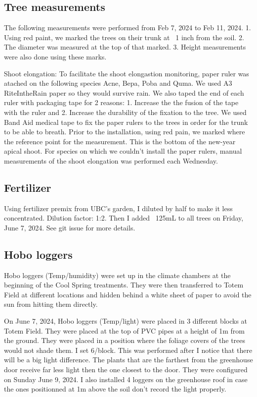 \documentclass{article}
\begin{document}
\subsection{Tree measurements}
The following measurements were performed from Feb 7, 2024 to Feb 11, 2024.
1. Using red paint, we marked the trees on their trunk at ~1 inch from the soil. 2. The diameter was measured at the top of that marked. 3. Height measurements were also done using these marks. 
\par
Shoot elongation: To facilitate the shoot elongastion monitoring,  paper ruler was atached on the following species Acne, Bepa, Poba and Quma. We used A3 RiteIntheRain paper so they would survive rain. We also taped the end of each ruler with packaging tape for 2 reasons: 1. Increase the the fusion of the tape with the ruler and 2. Increase the durability of the fixation to the tree. We used Band Aid medical tape to fix the paper rulers to the trees in order for the trunk to be able to breath. Prior to the installation, using red pain, we marked where the reference point for the measurement. This is the bottom of the new-year apical shoot. For species on which we couldn't install the paper rulers, manual measurements of the shoot elongation was performed each Wednesday. 
\subsection {Fertilizer}
Using fertilizer premix from UBC's garden, I diluted by half to make it less concentrated. Dilution factor: 1:2. Then I added ~125mL to all trees on Friday, June 7, 2024. See git issue for more details. 

\subsection{Hobo loggers}
Hobo loggers (Temp/humidity) were set up in the climate chambers at the beginning of the Cool Spring treatments. They were then transferred to Totem Field at different locations and hidden behind a white sheet of paper to avoid the sun from hitting them directly. 
\par 
On June 7, 2024, Hobo loggers (Temp/light) were placed in 3 different blocks at Totem Field. They were placed at the top of PVC pipes at a height of 1m from the ground. They were placed in a position where the foliage covers of the trees would not shade them. I set 6/block. This was performed after I notice that there will be a big light difference. The plants that are the farthest from the greenhouse door receive far less light then the one closest to the door. They were configured on Sunday June 9, 2024. I also installed 4 loggers on the greenhouse roof in case the ones positionned at 1m above the soil don't record the light properly. 
\end{document}
